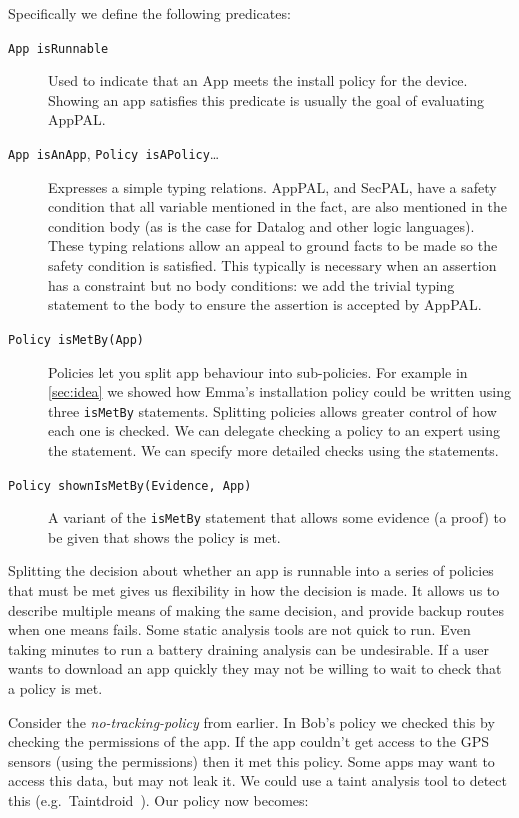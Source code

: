 \documentclass[]{llncs}
\begin{document}
Specifically we define the following predicates:
\begin{description}
  \item[\texttt{App isRunnable}]
    Used to indicate that an App meets the install policy for the device.
    Showing an app satisfies this predicate is usually the goal of evaluating AppPAL.

  \item[\texttt{App isAnApp}, \texttt{Policy isAPolicy}\ldots]
    Expresses a simple typing relations.
    AppPAL, and SecPAL, have a safety condition that all variable mentioned in the fact, are also mentioned in the condition body (as is the case for Datalog and other logic languages).
    These typing relations allow an appeal to ground facts to be made so the safety condition is satisfied.
    This typically is necessary when an assertion has a constraint but no body conditions: we add the trivial typing statement to the body to ensure the assertion is accepted by AppPAL.

  \item[\texttt{Policy isMetBy(App)}]
    Policies let you split app behaviour into sub-policies.
    For example in \autoref{sec:idea} we showed how Emma's installation policy could be written using three \texttt{isMetBy} statements.
    Splitting policies allows greater control of how each one is checked.
    We can delegate checking a policy to an expert using the  statement.
    We can specify more detailed checks using the  statements.

  \item[\texttt{Policy shownIsMetBy(Evidence, App)}]
    A variant of the \texttt{isMetBy} statement that allows some evidence (a proof) to be given that shows the policy is met.
\end{description}

Splitting the decision about whether an app is runnable into a series of policies that must be met gives us flexibility in how the decision is made.
It allows us to describe multiple means of making the same decision, and provide backup routes when one means fails.
Some static analysis tools are not quick to run.
Even taking minutes to run a battery draining analysis can be undesirable.
If a user wants to download an app quickly they may not be willing to wait to check that a policy is met.

Consider the \emph{no-tracking-policy} from earlier.
In Bob's policy we checked this by checking the permissions of the app.
If the app couldn't get access to the GPS sensors (using the permissions) then it met this policy.
Some apps may want to access this data, but may not leak it.
We could use a taint analysis tool to detect this (e.g.~Taintdroid~\cite{Fritz:2013vi}).
Our policy now becomes:
\end{document}
